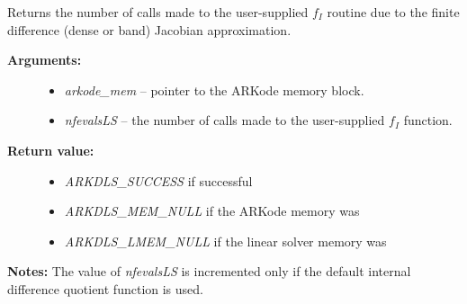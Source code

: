 \documentclass[letterpaper,10pt,english]{sphinxmanual}
\begin{document}
\begin{fulllineitems}
\label{c_interface/User_callable:ARKDlsGetNumRhsEvals}
Returns the number of calls made to the user-supplied
$f_I$ routine due to the finite difference (dense or band)
Jacobian approximation.
\begin{description}
\item[{\textbf{Arguments:}}] \leavevmode\begin{itemize}
\item {} 
\emph{arkode\_mem} -- pointer to the ARKode memory block.

\item {} 
\emph{nfevalsLS} -- the number of calls made to the user-supplied
$f_I$ function.

\end{itemize}

\item[{\textbf{Return value:}}] \leavevmode\begin{itemize}
\item {} 
\emph{ARKDLS\_SUCCESS} if successful

\item {} 
\emph{ARKDLS\_MEM\_NULL} if the ARKode memory was 

\item {} 
\emph{ARKDLS\_LMEM\_NULL} if the linear solver memory was 

\end{itemize}

\end{description}

\textbf{Notes:} The value of \emph{nfevalsLS} is incremented only if the default
internal difference quotient function is used.

\end{fulllineitems}

\end{document}

